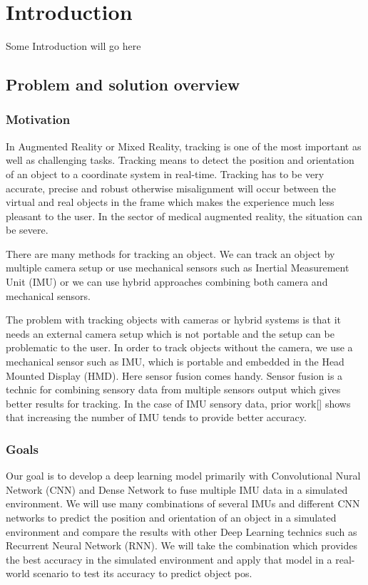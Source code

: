 
\chapter{Introduction}\label{chapter:introduction}
Some Introduction will go here
\section{Problem and solution overview}

\subsection{Motivation}
In Augmented Reality or Mixed Reality, tracking is one of the most important as well as challenging tasks. Tracking means to detect the position and orientation of an object to a coordinate system in real-time. Tracking has to be very accurate, precise and robust otherwise misalignment will occur between the virtual and real objects in the frame which makes the experience much less pleasant to the user. In the sector of medical augmented reality, the situation can be severe.

There are many methods for tracking an object. We can track an object by multiple camera setup or use mechanical sensors such as Inertial Measurement Unit (IMU) or we can use hybrid approaches combining both camera and mechanical sensors.

The problem with tracking objects with cameras or hybrid systems is that it needs an external camera setup which is not portable and the setup can be problematic to the user. In order to track objects without the camera, we use a mechanical sensor such as IMU, which is portable and embedded in the Head Mounted Display (HMD). Here sensor fusion comes handy. Sensor fusion is a technic for combining sensory data from multiple sensors output which gives better results for tracking. In the case of IMU sensory data, prior work[] shows that increasing the number of IMU tends to provide better accuracy.

\subsection{Goals}
Our goal is to develop a deep learning model primarily with Convolutional Nural Network (CNN) and Dense Network to fuse multiple IMU data in a simulated environment. We will use many combinations of several IMUs and different CNN networks to predict the position and orientation of an object in a simulated environment and compare the results with other Deep Learning technics such as Recurrent Neural Network (RNN). We will take the combination which provides the best accuracy in the simulated environment and apply that model in a real-world scenario to test its accuracy to predict object pos.

